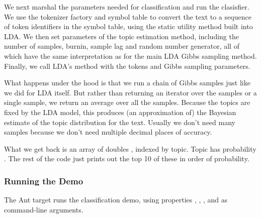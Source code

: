 We next marshal the parameters needed for classification and
run the clasisfier.
%
%
We use the tokenizer factory and symbol table to convert the text to a
sequence of token identifiers in the symbol table, using the static
utility method  built into LDA.  We then set
parameters of the topic estimation method, including the number of
samples, burnin, sample lag and random number generator, all of which
have the same interpretation as for the main LDA Gibbs sampling
method.  Finally, we call LDA's  method
with the tokens and Gibbs sampling parameters.

What happens under the hood is that we run a chain of Gibbs samples
just like we did for LDA itself.  But rather than returning an
iterator over the samples or a single sample, we return an average
over all the samples.  Because the topics are fixed by the LDA model,
this produces (an approximation of) the Bayesian estimate of the topic
distribution for the text.  Usually we don't need many samples because
we don't need multiple decimal places of accuracy.

What we get back is an array of doubles , indexed by
topic.  Topic  has probability .  The
rest of the code just prints out the top 10 of these in order of
probability. 


\subsubsection{Running the Demo}

The Ant target  runs the classification demo,
using properties , ,
, and  as command-line arguments.

